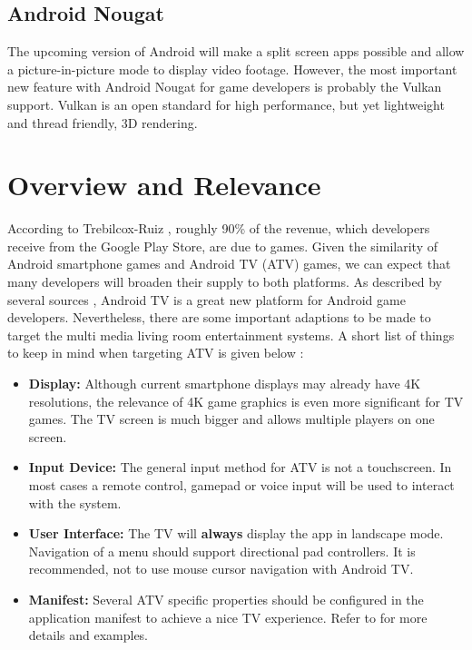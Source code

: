 \documentclass[a4paper]{article}
\begin{document}
\subsection{Android Nougat}
\label{outlook}
The upcoming version of Android will make a split screen apps possible and allow a picture-in-picture mode to display video footage. However, the most important new feature with Android Nougat for game developers is probably the Vulkan support. Vulkan is an open standard for high performance, but yet lightweight and thread friendly, 3D rendering.

\section{Overview and Relevance}
According to Trebilcox-Ruiz \cite{Trebilcox-Ruiz2016}, roughly 90\% of the revenue, which developers receive from the Google Play Store, are due to games. Given the similarity of Android smartphone games and Android TV (ATV) games, we can expect that many developers will broaden their supply to both platforms.
As described by several sources \cite{Trebilcox-Ruiz2016,Android-Developer:TV,NVIDIA-Developer:TV}, Android TV is a great new platform for Android game developers. Nevertheless, there are some important adaptions to be made to target the multi media living room entertainment systems. A short list of things to keep in mind when targeting ATV is given below \cite{Android-Developer:TV}:
\begin{itemize}
\item{\textbf{Display:}} Although current smartphone displays may already have 4K resolutions, the relevance of 4K game graphics is even more significant for TV games. The TV screen is much bigger and allows multiple players on one screen.
\item{\textbf{Input Device:}} The general input method for ATV is not a touchscreen. In most cases a remote control, gamepad or voice input will be used to interact with the system.
\item{\textbf{User Interface:}} The TV will \textbf{always} display the app in landscape mode. Navigation of a menu should support directional pad controllers. It is recommended, not to use mouse cursor navigation with Android TV.
\item{\textbf{Manifest:}} Several ATV specific properties should be configured in the application manifest to achieve a nice TV experience. Refer to \cite{Android-Developer:TV,NVIDIA-Developer:TV} for more details and examples.\\
\end{itemize}
\end{document}
